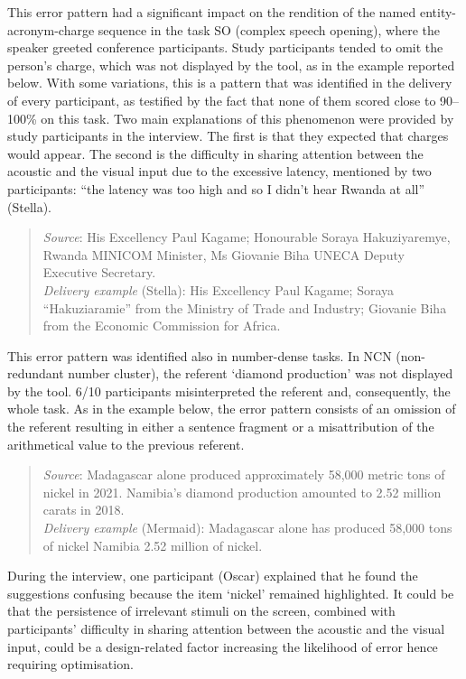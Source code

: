 \begin{sloppypar}
This error pattern had a significant impact on the rendition of the named entity-acronym-charge sequence in the task SO (complex speech opening), where the speaker greeted conference participants. Study participants tended to omit the person’s charge, which was not displayed by the tool, as in the example reported below. With some variations, this is a pattern that was identified in the delivery of every participant, as testified by the fact that none of them scored close to 90--100\% on this task. Two main explanations of this phenomenon were provided by study participants in the interview. The first is that they expected that charges would appear. The second is the difficulty in sharing attention between the acoustic and the visual input due to the excessive latency, mentioned by two participants: ``the latency was too high and so I didn’t hear Rwanda at all'' (Stella).
\end{sloppypar}
\begin{quote}
\begin{sloppypar}
    \textit{Source}: His Excellency Paul Kagame; Honourable Soraya Hakuziyaremye, Rwanda MINICOM Minister, Ms Giovanie Biha UNECA Deputy Executive Secretary.\\
\textit{Delivery example} (Stella): His Excellency Paul Kagame; Soraya ``Hakuziaramie'' from the Ministry of Trade and Industry; Giovanie Biha from the Economic Commission for Africa.
\end{sloppypar}
\end{quote}
This error pattern was identified also in number-dense tasks. In NCN (non-re\-dun\-dant number cluster), the referent ‘diamond production’ was not displayed by the tool. 6/10 participants misinterpreted the referent and, consequently, the whole task. As in the example below, the error pattern consists of an omission of the referent resulting in either a sentence fragment or a misattribution of the arithmetical value to the previous referent.
\begin{quote}
    \textit{Source}: Madagascar alone produced approximately 58,000 metric tons of nickel in 2021. Namibia's diamond production amounted to 2.52 million carats in 2018.\\
\textit{Delivery example} (Mermaid): Madagascar alone has produced 58,000 tons of nickel Namibia 2.52 million of nickel.
\end{quote}
During the interview, one participant (Oscar) explained that he found the suggestions confusing because the item ‘nickel’ remained highlighted. It could be that the persistence of irrelevant stimuli on the screen, combined with participants’ difficulty in sharing attention between the acoustic and the visual input, could be a design-related factor increasing the likelihood of error hence requiring optimisation.



